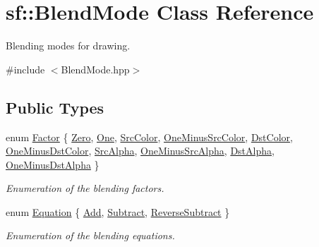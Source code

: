 \hypertarget{structsf_1_1_blend_mode}{}\section{sf\+:\+:Blend\+Mode Class Reference}
\label{structsf_1_1_blend_mode}


Blending modes for drawing.  




{\ttfamily \#include $<$Blend\+Mode.\+hpp$>$}

\subsection*{Public Types}
\begin{DoxyCompactItemize}
\item 
enum \mbox{\hyperlink{structsf_1_1_blend_mode_afb9852caf356b53bb0de460c58a9ebbb}{Factor}} \{ \newline
\mbox{\hyperlink{structsf_1_1_blend_mode_afb9852caf356b53bb0de460c58a9ebbbafda2d66c3c3da15cd3b42338fbf6d2ba}{Zero}}, 
\mbox{\hyperlink{structsf_1_1_blend_mode_afb9852caf356b53bb0de460c58a9ebbbaa2d3ba8b8bb2233c9d357cbb94bf4181}{One}}, 
\mbox{\hyperlink{structsf_1_1_blend_mode_afb9852caf356b53bb0de460c58a9ebbbad679bb0ecaf15c188d7f2e1fab572188}{Src\+Color}}, 
\mbox{\hyperlink{structsf_1_1_blend_mode_afb9852caf356b53bb0de460c58a9ebbba5971ffdbca63382058ccba76bfce219e}{One\+Minus\+Src\+Color}}, 
\newline
\mbox{\hyperlink{structsf_1_1_blend_mode_afb9852caf356b53bb0de460c58a9ebbba3d85281c3eab7153f2bd9faae3e7523a}{Dst\+Color}}, 
\mbox{\hyperlink{structsf_1_1_blend_mode_afb9852caf356b53bb0de460c58a9ebbbac8198db20d14506a841d1091ced1cae2}{One\+Minus\+Dst\+Color}}, 
\mbox{\hyperlink{structsf_1_1_blend_mode_afb9852caf356b53bb0de460c58a9ebbbaac0ae68df2930b4d616c3e7abeec7d41}{Src\+Alpha}}, 
\mbox{\hyperlink{structsf_1_1_blend_mode_afb9852caf356b53bb0de460c58a9ebbbaab57e8616bf4c21d8ee923178acdf2c8}{One\+Minus\+Src\+Alpha}}, 
\newline
\mbox{\hyperlink{structsf_1_1_blend_mode_afb9852caf356b53bb0de460c58a9ebbba5e3dc9a6f117aaa5f7433e1f4662a5f7}{Dst\+Alpha}}, 
\mbox{\hyperlink{structsf_1_1_blend_mode_afb9852caf356b53bb0de460c58a9ebbbab4e5c63f189f26075e5939ad1a2ce4e4}{One\+Minus\+Dst\+Alpha}}
 \}
\begin{DoxyCompactList}\small\item\em Enumeration of the blending factors. \end{DoxyCompactList}\item 
enum \mbox{\hyperlink{structsf_1_1_blend_mode_a7bce470e2e384c4f9c8d9595faef7c32}{Equation}} \{ \mbox{\hyperlink{structsf_1_1_blend_mode_a7bce470e2e384c4f9c8d9595faef7c32a50c081d8f36cf7b77632966e15d38966}{Add}}, 
\mbox{\hyperlink{structsf_1_1_blend_mode_a7bce470e2e384c4f9c8d9595faef7c32a14c825be24f8412fc5ed5b49f19bc0d0}{Subtract}}, 
\mbox{\hyperlink{structsf_1_1_blend_mode_a7bce470e2e384c4f9c8d9595faef7c32a2d04acf59e91811128e7d0ef076f65f0}{Reverse\+Subtract}}
 \}
\begin{DoxyCompactList}\small\item\em Enumeration of the blending equations. \end{DoxyCompactList}\end{DoxyCompactItemize}
